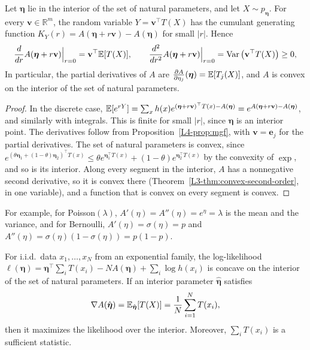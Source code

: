 \begin{proposition}\label{L4-prop:log-partition}
    Let $\boldsymbol{\eta}$ lie in the interior of the set of natural parameters, and let $X \sim p_{\boldsymbol{\eta}}$. For every $\mathbf{v} \in \mathbb{R}^m$, the random variable $Y = \mathbf{v}^\top T(X)$ has the cumulant generating function $K_Y(r) = A(\boldsymbol{\eta} + r\mathbf{v}) - A(\boldsymbol{\eta})$ for small $|r|$. Hence
    \[\frac{d}{dr}A(\boldsymbol{\eta} + r\mathbf{v})\Big|_{r=0} = \mathbf{v}^\top\mathbb{E}[T(X)], \qquad \frac{d^2}{dr^2}A(\boldsymbol{\eta} + r\mathbf{v})\Big|_{r=0} = \operatorname{Var}\big(\mathbf{v}^\top T(X)\big) \geq 0,\]
    In particular, the partial derivatives of $A$ are $\frac{\partial A}{\partial\eta_j}(\boldsymbol{\eta}) = \mathbb{E}[T_j(X)]$, and $A$ is convex on the interior of the set of natural parameters.
\end{proposition}

\begin{proof}
    In the discrete case, $\mathbb{E}[e^{rY}] = \sum_x h(x)e^{(\boldsymbol{\eta} + r\mathbf{v})^\top T(x) - A(\boldsymbol{\eta})} = e^{A(\boldsymbol{\eta} + r\mathbf{v}) - A(\boldsymbol{\eta})}$, and similarly with integrals. This is finite for small $|r|$, since $\boldsymbol{\eta}$ is an interior point. The derivatives follow from Proposition~\ref{L4-prop:mgf}, with $\mathbf{v} = \mathbf{e}_j$ for the partial derivatives. The set of natural parameters is convex, since $e^{(\theta\boldsymbol{\eta}_1 + (1 - \theta)\boldsymbol{\eta}_2)^\top T(x)} \leq \theta e^{\boldsymbol{\eta}_1^\top T(x)} + (1 - \theta)e^{\boldsymbol{\eta}_2^\top T(x)}$ by the convexity of $\exp$, and so is its interior. Along every segment in the interior, $A$ has a nonnegative second derivative, so it is convex there (Theorem~\ref{L3-thm:convex-second-order}, in one variable), and a function that is convex on every segment is convex.
\end{proof}

For example, for Poisson$(\lambda)$, $A'(\eta) = A''(\eta) = e^\eta = \lambda$ is the mean and the variance, and for Bernoulli, $A'(\eta) = \sigma(\eta) = p$ and $A''(\eta) = \sigma(\eta)(1 - \sigma(\eta)) = p(1 - p)$.

\begin{theorem}\label{L4-thm:exp-family-mle}
    For i.i.d.\ data $x_1, \ldots, x_N$ from an exponential family, the log-likelihood $\ell(\boldsymbol{\eta}) = \boldsymbol{\eta}^\top\sum_i T(x_i) - NA(\boldsymbol{\eta}) + \sum_i \log h(x_i)$ is concave on the interior of the set of natural parameters. If an interior parameter $\hat{\boldsymbol{\eta}}$ satisfies
    \[\nabla A(\hat{\boldsymbol{\eta}}) = \mathbb{E}_{\hat{\boldsymbol{\eta}}}[T(X)] = \frac{1}{N}\sum_{i=1}^N T(x_i),\]
    then it maximizes the likelihood over the interior. Moreover, $\sum_i T(x_i)$ is a sufficient statistic.
\end{theorem}

